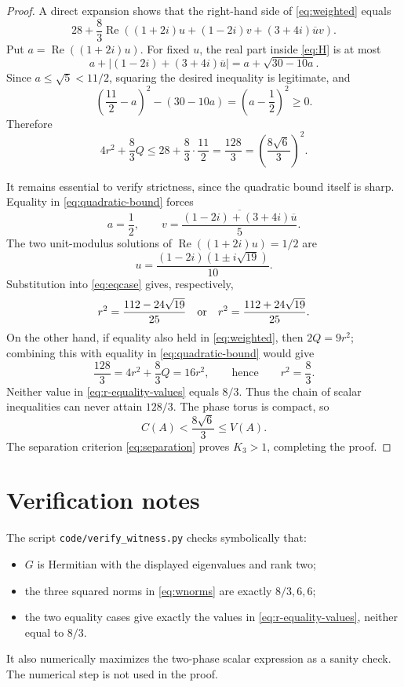 \documentclass[11pt]{article}
\newcommand{\Rea}{\operatorname{Re}}
\begin{document}
\begin{proof}
A direct expansion shows that the right-hand side of
\eqref{eq:weighted} equals
\begin{equation}\label{eq:H}
28+\frac83\Rea\left((1+2i)u+(1-2i)v
 +(3+4i)\overline u v\right).
\end{equation}
Put $a=\Rea((1+2i)u)$.  For fixed $u$, the real part inside
\eqref{eq:H} is at most
\[
a+\left|(1-2i)+(3+4i)\overline u\right|
=a+\sqrt{30-10a}.
\]
Since $a\leq\sqrt5<11/2$, squaring the desired inequality is legitimate,
and
\[
\left(\frac{11}{2}-a\right)^2-(30-10a)
=\left(a-\frac12\right)^2\geq0.
\]
Therefore
\begin{equation}\label{eq:quadratic-bound}
4r^2+\frac83Q\leq28+\frac83\cdot\frac{11}{2}
=\frac{128}{3}=\left(\frac{8\sqrt6}{3}\right)^2.
\end{equation}

It remains essential to verify strictness, since the quadratic bound itself
is sharp.  Equality in \eqref{eq:quadratic-bound} forces
\begin{equation}\label{eq:eqcase}
a=\frac12,\qquad
v=\frac{\overline{(1-2i)+(3+4i)\overline u}}{5}.
\end{equation}
The two unit-modulus solutions of $\Rea((1+2i)u)=1/2$ are
\[
u=\frac{(1-2i)(1\pm i\sqrt{19})}{10}.
\]
Substitution into \eqref{eq:eqcase} gives, respectively,
\begin{equation}\label{eq:r-equality-values}
r^2=\frac{112-24\sqrt{19}}{25}
\quad\hbox{or}\quad
r^2=\frac{112+24\sqrt{19}}{25}.
\end{equation}
On the other hand, if equality also held in \eqref{eq:weighted}, then
$2Q=9r^2$; combining this with equality in
\eqref{eq:quadratic-bound} would give
\[
\frac{128}{3}=4r^2+\frac83Q=16r^2,
\qquad\text{hence}\qquad r^2=\frac83.
\]
Neither value in \eqref{eq:r-equality-values} equals $8/3$.  Thus the
chain of scalar inequalities can never attain $128/3$.  The phase torus is
compact, so
\[
C(A)<\frac{8\sqrt6}{3}\leq V(A).
\]
The separation criterion \eqref{eq:separation} proves $K_3>1$, completing
the proof.
\end{proof}

\section{Verification notes}

The script \texttt{code/verify\_witness.py} checks symbolically that:
\begin{itemize}
\item $G$ is Hermitian with the displayed eigenvalues and rank two;
\item the three squared norms in \eqref{eq:wnorms} are exactly $8/3,6,6$;
\item the two equality cases give exactly the values in
  \eqref{eq:r-equality-values}, neither equal to $8/3$.
\end{itemize}
It also numerically maximizes the two-phase scalar expression as a sanity
check.  The numerical step is not used in the proof.
\end{document}
